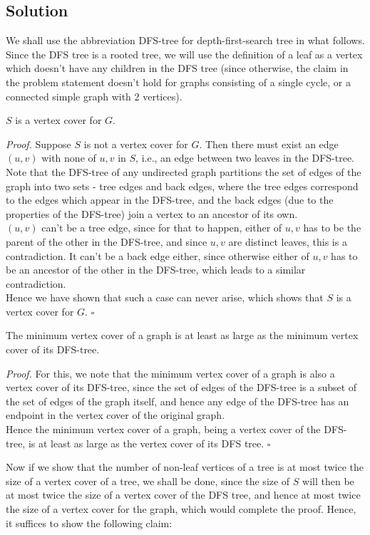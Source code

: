 \documentclass[a4paper]{article}
\newenvironment{proof}{\begin{breakbox}\textit{Proof.}}{\hfill$\square$\end{breakbox}}
\newcommand{\nl}{\vspace{0.2cm}\\}
\begin{document}
\subsection{Solution}
We shall use the abbreviation DFS-tree for depth-first-search tree in what follows.\nl
Since the DFS tree is a rooted tree, we will use the definition of a leaf as a vertex which doesn't have any children in the DFS tree (since otherwise, the claim in the problem statement doesn't
hold for graphs consisting of a single cycle, or a connected simple graph with 2 vertices).\nl
\begin{claim}
    $S$ is a vertex cover for $G$.
\end{claim}
\begin{proof}
    Suppose $S$ is not a vertex cover for $G$. Then there must exist an edge $(u, v)$ with none of $u, v$ in $S$, i.e., an edge between two leaves in the DFS-tree.\nl
    Note that the DFS-tree of any undirected graph partitions the set of edges of the graph into two sets - tree edges and back edges, where the tree edges correspond to the edges which appear in
    the DFS-tree, and the back edges (due to the properties of the DFS-tree) join a vertex to an ancestor of its own.\nl
    $(u, v)$ can't be a tree edge, since for that to happen, either of $u, v$ has to be the parent of the other in the DFS-tree, and since $u, v$ are distinct leaves, this is a contradiction. It can't be a back edge
    either, since otherwise either of $u, v$ has to be an ancestor of the other in the DFS-tree, which leads to a similar contradiction.\nl
    Hence we have shown that such a case can never arise, which shows that $S$ is a vertex cover for $G$.
\end{proof}
\begin{claim}
    The minimum vertex cover of a graph is at least as large as the minimum vertex cover of its DFS-tree.
\end{claim}
\begin{proof}
    For this, we note that the minimum vertex cover of a graph is also a vertex cover of its DFS-tree, since the set of edges of the DFS-tree is a subset of the set of edges of the graph itself, and
    hence any edge of the DFS-tree has an endpoint in the vertex cover of the original graph.\nl
    Hence the minimum vertex cover of a graph, being a vertex cover of the DFS-tree, is at least as large as the vertex cover of its DFS tree.
\end{proof}

Now if we show that the number of non-leaf vertices of a tree is at most twice the size of a vertex cover of a tree, we shall be done, since the size of $S$ will then be at most twice the size of a
vertex cover of the DFS tree, and hence at most twice the size of a vertex cover for the graph, which would complete the proof. Hence, it suffices to show the following claim:\nl
\end{document}
